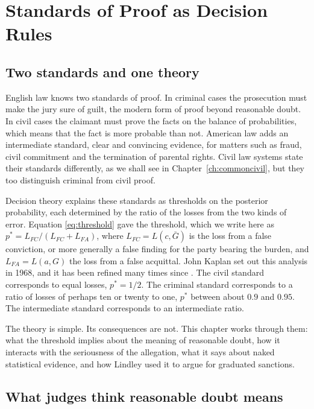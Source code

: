 \chapter{Standards of Proof as Decision Rules}
\label{ch:standards}

\section{Two standards and one theory}

English law knows two standards of proof. In criminal cases the prosecution must make the jury sure of guilt, the modern form of proof beyond reasonable doubt. In civil cases the claimant must prove the facts on the balance of probabilities, which means that the fact is more probable than not. American law adds an intermediate standard, clear and convincing evidence, for matters such as fraud, civil commitment and the termination of parental rights. Civil law systems state their standards differently, as we shall see in Chapter~\ref{ch:commoncivil}, but they too distinguish criminal from civil proof.

Decision theory explains these standards as thresholds on the posterior probability, each determined by the ratio of the losses from the two kinds of error. Equation \eqref{eq:threshold} gave the threshold, which we write here as $p^\ast = L_{FC}/(L_{FC} + L_{FA})$, where $L_{FC} = L(c,\bar G)$ is the loss from a false conviction, or more generally a false finding for the party bearing the burden, and $L_{FA} = L(a,G)$ the loss from a false acquittal. John Kaplan set out this analysis in 1968, and it has been refined many times since \citep{kaplan1968,kaye1999}. The civil standard corresponds to equal losses, $p^\ast = 1/2$. The criminal standard corresponds to a ratio of losses of perhaps ten or twenty to one, $p^\ast$ between about $0.9$ and $0.95$. The intermediate standard corresponds to an intermediate ratio.

The theory is simple. Its consequences are not. This chapter works through them: what the threshold implies about the meaning of reasonable doubt, how it interacts with the seriousness of the allegation, what it says about naked statistical evidence, and how Lindley used it to argue for graduated sanctions.

\section{What judges think reasonable doubt means}


